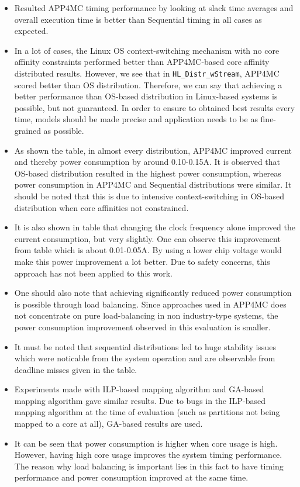 \begin{itemize}
	\item Resulted APP4MC timing performance by looking at slack time averages and overall execution time is better than Sequential timing in all cases as expected.
	\item In a lot of cases, the Linux OS context-switching mechanism with no core affinity constraints performed better than APP4MC-based core affinity distributed results. However, we see that in \texttt{HL{\_}Distr{\_}wStream}, APP4MC scored better than OS distribution. Therefore, we can say that achieving a better performance than OS-based distribution in Linux-based systems is possible, but not guaranteed. In order to ensure to obtained best results every time, models should be made precise and application needs to be as fine-grained as possible.
	\item As shown the table, in almost every distribution, APP4MC improved current and thereby power consumption by around 0.10-0.15A. It is observed that OS-based distribution resulted in the highest power consumption, whereas power consumption in APP4MC and Sequential distributions were similar. It should be noted that this is due to intensive context-switching in OS-based distribution when core affinities not constrained.
	\item It is also shown in table that changing the clock frequency alone improved the current consumption, but very slightly. One can observe this improvement from table which is about 0.01-0.05A. By using a lower chip voltage would make this power improvement a lot better. Due to safety concerns, this approach has not been applied to this work. 
	\item One should also note that achieving significantly reduced power consumption is possible through load balancing. Since approaches used in APP4MC does not concentrate on pure load-balancing in non industry-type systems, the power consumption improvement observed in this evaluation is smaller.
	\item It must be noted that sequential distributions led to huge stability issues which were noticable from the system operation and are observable from deadline misses given in the table.
	\item Experiments made with ILP-based mapping algorithm and GA-based mapping algorithm gave similar results. Due to bugs in the ILP-based mapping algorithm at the time of evaluation (such as partitions not being mapped to a core at all), GA-based results are used.
	\item It can be seen that power consumption is higher when core usage is high. However, having high core usage improves the system timing performance. The reason why load balancing is important lies in this fact to have timing performance and power consumption improved at the same time.

\end{itemize}
